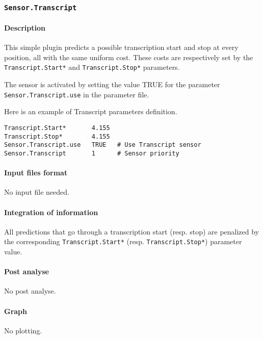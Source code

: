 
\subsubsection{\texttt{Sensor.Transcript}}

\paragraph{Description}

This simple plugin predicts a possible transcription start and stop at
every position, all with the same uniform cost. These costs are
respectively set by the \texttt{Transcript.Start*} and
\texttt{Transcript.Stop*} parameters.

The sensor is activated by setting the value TRUE for the parameter
\texttt{Sensor.Transcript.use} in the parameter file. 

Here is an example of Transcript parameters definition.
\begin{Verbatim}[fontsize=\small]
Transcript.Start*       4.155
Transcript.Stop*        4.155
Sensor.Transcript.use   TRUE   # Use Transcript sensor
Sensor.Transcript       1      # Sensor priority
\end{Verbatim}

\paragraph{Input files format}

No input file needed.

\paragraph{Integration of information}

All predictions that go through a transcription start (resp. stop) are
penalized by the corresponding \texttt{Transcript.Start*} (resp. 
\texttt{Transcript.Stop*}) parameter value.

\paragraph{Post analyse}

No post analyse.

\paragraph{Graph}

No plotting.




